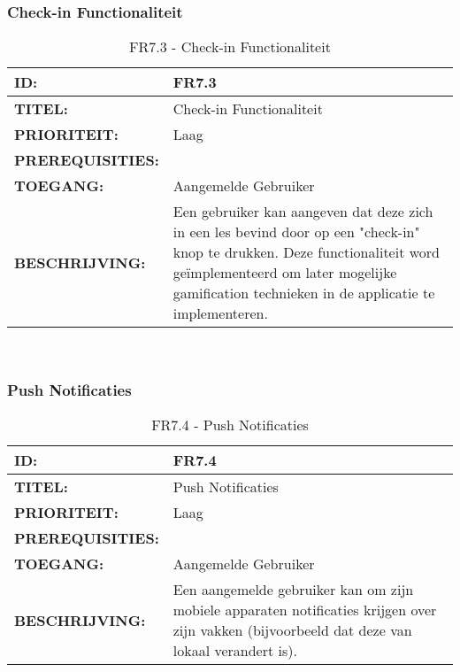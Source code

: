 \subsubsection{Check-in Functionaliteit} 
\noindent\begin{table}[H]
            \begin{tabular}{l | p{10cm}}
                \textbf{ID:} & FR7.3 \\ \hline
                \textbf{TITEL:} & Check-in Functionaliteit\\ \hline
                \textbf{PRIORITEIT:} &  Laag \\ \hline
                \textbf{PREREQUISITIES:} & \\ \hline
                \textbf{TOEGANG:} & Aangemelde Gebruiker \\ \hline
                \textbf{BESCHRIJVING:} & Een gebruiker kan aangeven dat deze zich in een les bevind door op een "check-in" knop te drukken. Deze functionaliteit word geïmplementeerd om later mogelijke gamification technieken in de applicatie te implementeren.\\ 
            \end{tabular}\\
            \caption{FR7.3 - Check-in Functionaliteit}
            \label{tab:FR7.3 - Check-in Functionaliteit}
        \end{table}

\subsubsection{Push Notificaties} 
\noindent\begin{table}[H]
            \begin{tabular}{l | p{10cm}}
                \textbf{ID:} & FR7.4 \\ \hline
                \textbf{TITEL:} & Push Notificaties\\ \hline
                \textbf{PRIORITEIT:} &  Laag \\ \hline
                \textbf{PREREQUISITIES:} & \\ \hline
                \textbf{TOEGANG:} & Aangemelde Gebruiker \\ \hline
                \textbf{BESCHRIJVING:} & Een aangemelde gebruiker kan om zijn mobiele apparaten notificaties krijgen over zijn vakken (bijvoorbeeld dat deze van lokaal verandert is). \\ 
            \end{tabular}\\
            \caption{FR7.4 - Push Notificaties}
            \label{tab:FR7.4 - Push Notificaties}
        \end{table}
\clearpage

      
